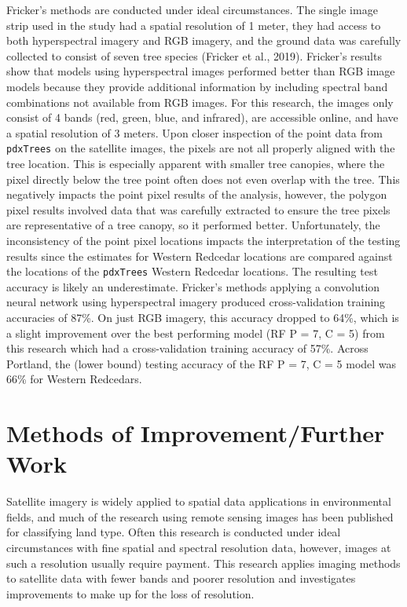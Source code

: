 \documentclass[12pt,twoside]{reedthesis}
\begin{document}
Fricker's methods are conducted under ideal circumstances. The single image strip used in the study had a spatial resolution of 1 meter, they had access to both hyperspectral imagery and RGB imagery, and the ground data was carefully collected to consist of seven tree species (Fricker et al., 2019). Fricker's results show that models using hyperspectral images performed better than RGB image models because they provide additional information by including spectral band combinations not available from RGB images. For this research, the images only consist of 4 bands (red, green, blue, and infrared), are accessible online, and have a spatial resolution of 3 meters. Upon closer inspection of the point data from \texttt{pdxTrees} on the satellite images, the pixels are not all properly aligned with the tree location. This is especially apparent with smaller tree canopies, where the pixel directly below the tree point often does not even overlap with the tree. This negatively impacts the point pixel results of the analysis, however, the polygon pixel results involved data that was carefully extracted to ensure the tree pixels are representative of a tree canopy, so it performed better. Unfortunately, the inconsistency of the point pixel locations impacts the interpretation of the testing results since the estimates for Western Redcedar locations are compared against the locations of the \texttt{pdxTrees} Western Redcedar locations. The resulting test accuracy is likely an underestimate. Fricker's methods applying a convolution neural network using hyperspectral imagery produced cross-validation training accuracies of 87\%. On just RGB imagery, this accuracy dropped to 64\%, which is a slight improvement over the best performing model (RF P = 7, C = 5) from this research which had a cross-validation training accuracy of 57\%. Across Portland, the (lower bound) testing accuracy of the RF P = 7, C = 5 model was 66\% for Western Redcedars.

\hypertarget{methods-of-improvementfurther-work}{%
\section{Methods of Improvement/Further Work}\label{methods-of-improvementfurther-work}}

Satellite imagery is widely applied to spatial data applications in environmental fields, and much of the research using remote sensing images has been published for classifying land type. Often this research is conducted under ideal circumstances with fine spatial and spectral resolution data, however, images at such a resolution usually require payment. This research applies imaging methods to satellite data with fewer bands and poorer resolution and investigates improvements to make up for the loss of resolution.
\end{document}

